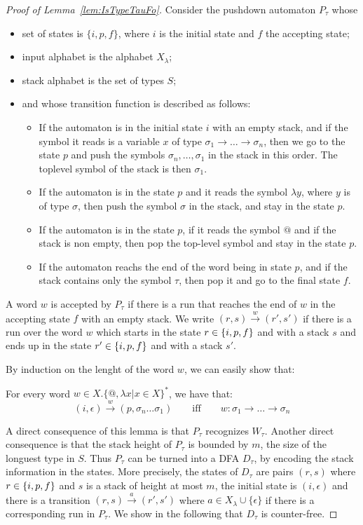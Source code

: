 \begin{proof}[Proof of Lemma~\ref{lem:IsTypeTauFo}]
Consider the pushdown automaton $P_\tau$ whose
\begin{itemize}
\item  set of states is $\{i, p, f\}$, where $i$ is the initial state and $f$ the accepting state;
\item input alphabet is the alphabet $X_\lambda$;
\item stack alphabet is the set of types $S$;
\item and whose transition function is described as follows:
\begin{itemize}
\item If the automaton is in the initial state $i$ with an empty stack, and if the symbol it reads is a variable $x$ of type $\sigma_1\rightarrow\dots\rightarrow\sigma_n$, then we go to the state $p$ and push the symbols $\sigma_n,\dots,\sigma_1$  in the stack in this order. The toplevel symbol of the stack is then $\sigma_1$.
\item If the automaton is in the state $p$ and it reads the symbol $\lambda y$, where $y$ is of type $\sigma$, then push the symbol $\sigma$ in the stack, and stay in the state $p$.
\item  If the automaton is in the state $p$,  if it reads the symbol $@$ and if the stack is non empty, then pop the top-level symbol and stay in the state $p$.
\item If the automaton reachs the end of the word being in state $p$, and if the stack contains only the symbol $\tau$, then pop it and go to the final state $f$.  
\end{itemize}
\end{itemize}
A word $w$ is accepted by $P_\tau$ if there is a run that reaches the end of $w$ in the accepting state $f$ with an empty stack. We write $(r, s)\xrightarrow{w} (r', s')$ if there is a run over the word $w$ which starts in the state $r\in\{i, p,f\}$ and with a stack $s$ and ends up in the state $r'\in\{i, p,f\}$ and with a stack $s'$.


By induction on the lenght of the word $w$, we can easily show that:
\begin{lemma}
For every word $w\in X.\{@,\lambda x | x\in X \}^*$, we have that:
 $$(i, \epsilon)\xrightarrow{w} (p, \sigma_n\dots\sigma_1) \qquad\text{iff} \qquad 
w:\sigma_1\rightarrow\dots\rightarrow\sigma_n$$ 
\end{lemma}

A direct consequence of this lemma is that $P_\tau$ recognizes $W_\tau$. Another direct consequence is that the stack height of $P_\tau$ is bounded by $m$, the size of the longuest type in $S$. Thus $P_\tau$ can be turned into a DFA $D_\tau$, by encoding the stack information in the states. More precisely, the states of $D_\tau$ are pairs $(r,s)$ where $r\in \{i,p,f\}$ and $s$ is a stack of height at most $m$, the initial state is $(i,\epsilon)$ and there is a transition $(r,s)\xrightarrow{a}(r',s')$ where $a\in X_\lambda\cup\{\epsilon\}$ if there is a corresponding run in $P_\tau$. We show in the following that $D_\tau$ is counter-free. 


\end{proof}
